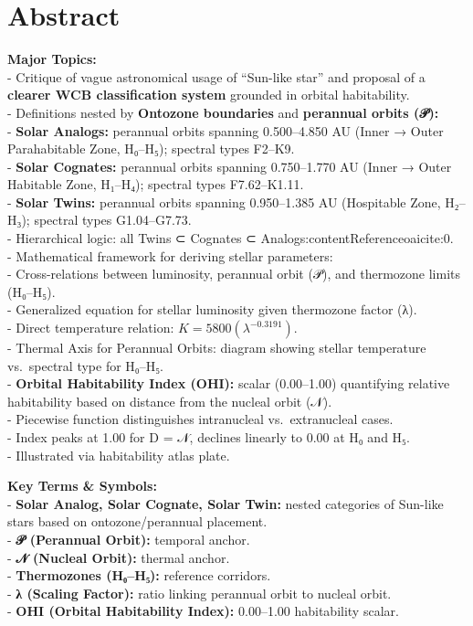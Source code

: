 \documentclass[
  letterpaper,
]{book}
\begin{document}
\section{Abstract}\label{abstract-13}

\textbf{Major Topics:}\\
- Critique of vague astronomical usage of ``Sun-like star'' and proposal
of a \textbf{clearer WCB classification system} grounded in orbital
habitability.\\
- Definitions nested by \textbf{Ontozone boundaries} and
\textbf{perannual orbits (𝒫):}\\
- \textbf{Solar Analogs:} perannual orbits spanning 0.500--4.850 AU
(Inner → Outer Parahabitable Zone, H₀--H₅); spectral types F2--K9.\\
- \textbf{Solar Cognates:} perannual orbits spanning 0.750--1.770 AU
(Inner → Outer Habitable Zone, H₁--H₄); spectral types F7.62--K1.11.\\
- \textbf{Solar Twins:} perannual orbits spanning 0.950--1.385 AU
(Hospitable Zone, H₂--H₃); spectral types G1.04--G7.73.\\
- Hierarchical logic: all Twins ⊂ Cognates ⊂
Analogs:contentReference{oaicite:0}.\\
- Mathematical framework for deriving stellar parameters:\\
- Cross-relations between luminosity, perannual orbit (𝒫), and
thermozone limits (H₀--H₅).\\
- Generalized equation for stellar luminosity given thermozone factor
(λ).\\
- Direct temperature relation: \(K = 5800(\lambda^{-0.3191})\).\\
- Thermal Axis for Perannual Orbits: diagram showing stellar temperature
vs.~spectral type for H₀--H₅.\\
- \textbf{Orbital Habitability Index (OHI):} scalar (0.00--1.00)
quantifying relative habitability based on distance from the nucleal
orbit (𝒩).\\
- Piecewise function distinguishes intranucleal vs.~extranucleal
cases.\\
- Index peaks at 1.00 for D = 𝒩, declines linearly to 0.00 at H₀ and
H₅.\\
- Illustrated via habitability atlas plate.

\textbf{Key Terms \& Symbols:}\\
- \textbf{Solar Analog, Solar Cognate, Solar Twin:} nested categories of
Sun-like stars based on ontozone/perannual placement.\\
- \textbf{𝒫 (Perannual Orbit):} temporal anchor.\\
- \textbf{𝒩 (Nucleal Orbit):} thermal anchor.\\
- \textbf{Thermozones (H₀--H₅):} reference corridors.\\
- \textbf{λ (Scaling Factor):} ratio linking perannual orbit to nucleal
orbit.\\
- \textbf{OHI (Orbital Habitability Index):} 0.00--1.00 habitability
scalar.
\end{document}
